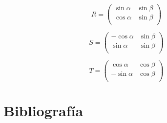 \documentclass[a4paper,11pt]{article}
\begin{document}
\begin{equation} \label{matrizR}
R =
\left( \begin{array}{cccc}
\sin \alpha & \sin \beta\\
\cos \alpha & \sin \beta\\
\end{array} \right)
\end{equation}

\begin{equation} \label{matrizS}
S =
\left( \begin{array}{cccc}
-\cos \alpha & \sin \beta\\
\sin \alpha & \sin \beta\\
\end{array} \right)
\end{equation}

\begin{equation} \label{matrizT}
T =
\left( \begin{array}{cccc}
\cos \alpha & \cos \beta\\
-\sin \alpha & \cos \beta\\
\end{array} \right)
\end{equation}

\newpage
\section{Bibliograf\'ia}
\end{document}
